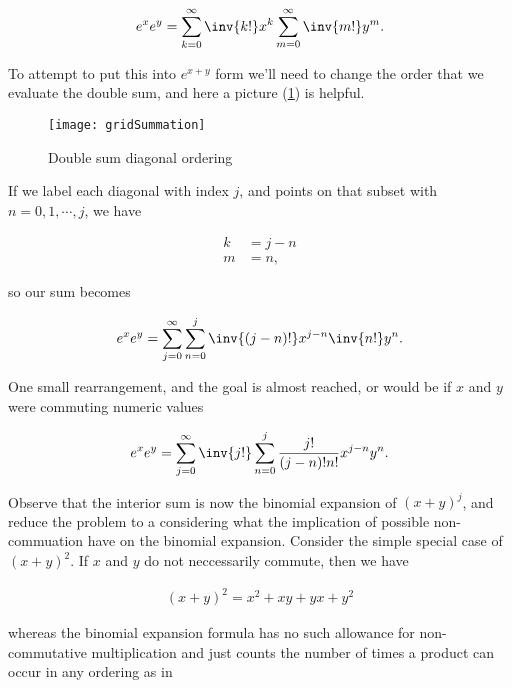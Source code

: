 \begin{align}\label{eqn:exponentialCommutation:3}
e^{x} e^{y} = 
\sum_{k=0}^\infty \inv{k!} x^k
\sum_{m=0}^\infty \inv{m!} y^m.
\end{align}

To attempt to put this into $e^{x + y}$ form we'll need to change the order that we evaluate the double sum, and here a picture (\ref{fig:gridSummation}) is helpful.

\begin{figure}[htp]
\centering
\texttt{[image: gridSummation]}
\caption{Double sum diagonal ordering}\label{fig:gridSummation}
\end{figure}

If we label each diagonal with index $j$, and points on that subset with $n=0,1,\cdots, j$, we have

\begin{align}\label{eqn:exponentialCommutation:4}
k &= j - n \\
m &= n,
\end{align}

so our sum becomes

\begin{align}\label{eqn:exponentialCommutation:5}
e^{x} e^{y} = 
\sum_{j=0}^\infty \sum_{n=0}^j
\inv{(j-n)!} x^{j-n}
\inv{n!} y^n.
\end{align}

One small rearrangement, and the goal is almost reached, or would be if $x$ and $y$ were commuting numeric values

\begin{align}\label{eqn:exponentialCommutation:6}
e^{x} e^{y} = 
\sum_{j=0}^\infty \inv{j!} \sum_{n=0}^j \frac{j!}{(j-n)! n!} x^{j-n} y^n.
\end{align}

Observe that the interior sum is now the binomial expansion of $(x + y)^j$, and reduce the problem to a considering what the implication of possible non-commuation have on the binomial expansion.  Consider the simple special case of $(x + y)^2$.  If $x$ and $y$ do not neccessarily commute, then we have

\begin{align}\label{eqn:exponentialCommutation:7}
(x + y)^2 = x^2 + x y + y x + y^2
\end{align}

whereas the binomial expansion formula has no such allowance for non-commutative multiplication and just counts the number of times a product can occur in any ordering as in


